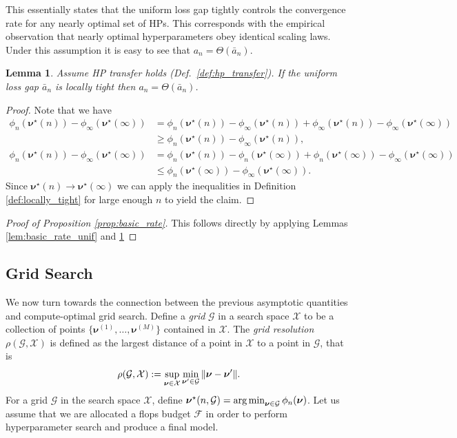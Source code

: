 \documentclass{article} %
\newtheorem{lemma}[theorem]{Lemma}
\newcommand{\bhp}{\bm{\nu}}                       %
\newcommand{\searchspace}{\mathcal{X}}            %
\newcommand{\grid}{\mathcal{G}}                   %
\newcommand{\gridres}{\rho}                       %
\newcommand{\gridresval}[2]{\gridres(#1, #2)}     %
\newcommand{\flops}{\mathcal{F}}
\begin{document}
This essentially states that the uniform loss gap tightly controls the convergence rate for any nearly optimal set of HPs. This corresponds with the empirical observation that nearly optimal hyperparameters obey identical scaling laws. Under this assumption it is easy to see that $a_n = \Theta(\bar{a}_n).$ 
\begin{lemma}\label{lem:unif_loss_gap}
    Assume HP transfer holds (Def.\ \ref{def:hp_transfer}). If the uniform loss gap $\bar{a}_n$ is locally tight then $a_n = \Theta(\bar{a}_n)$.
\end{lemma}
\begin{proof}
    Note that we have
    \begin{align*}
        \phi_n(\bhp^\star(n)) - \phi_\infty(\bhp^\star(\infty)) &= \phi_n(\bhp^\star(n)) - \phi_\infty(\bhp^\star(n)) + \phi_\infty(\bhp^\star(n)) - \phi_\infty(\bhp^\star(\infty))\\
        &\geq \phi_n(\bhp^\star(n)) - \phi_\infty(\bhp^\star(n)),\\
        \phi_n(\bhp^\star(n)) - \phi_\infty(\bhp^\star(\infty)) &= \phi_n(\bhp^\star(n)) - \phi_n(\bhp^\star(\infty)) + \phi_n(\bhp^\star(\infty)) - \phi_\infty(\bhp^\star(\infty))\\
        &\leq \phi_n(\bhp^\star(\infty)) - \phi_\infty(\bhp^\star(\infty)).
    \end{align*}
    Since $\bhp^\star(n) \to \bhp^\star(\infty)$ we can apply the inequalities in Definition \ref{def:locally_tight} for large enough $n$ to yield the claim.
\end{proof}
\begin{proof}[Proof of Proposition \ref{prop:basic_rate}]
    This follows directly by applying Lemmas \ref{lem:basic_rate_unif} and \ref{lem:unif_loss_gap}
\end{proof}


\subsection{Grid Search}\label{app:grid_search}
We now turn towards the connection between the previous asymptotic quantities and compute-optimal grid search. Define a \emph{grid} $\grid$ in a search space $\searchspace$ to be a collection of points $\{\bhp^{(1)}, \ldots, \bhp^{(M)}\}$ contained in $\searchspace$. The \emph{grid resolution} $\gridresval{\grid}{\searchspace}$ is defined as the largest distance of a point in $\searchspace$ to a point in $\grid$, that is
\[
    \gridresval{\grid}{\searchspace} := \sup_{\bhp \in \searchspace} \min_{\bhp' \in \grid} \norm{\bhp - \bhp'}.
\]
For a grid $\grid$ in the search space $\searchspace$, define $\bhp^\star(n, \grid) = \argmin_{\bhp \in \grid} \phi_n(\bhp)$. Let us assume that we are allocated a flops budget $\flops$ in order to perform hyperparameter search and produce a final model.  
\end{document}
